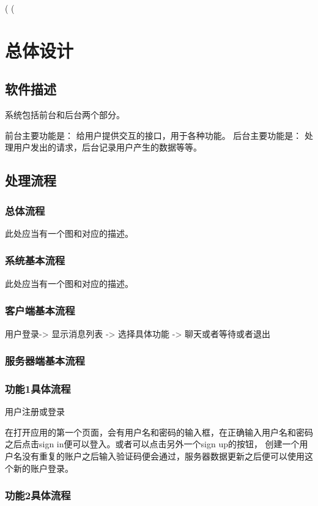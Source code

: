 \left( \left( \chapter{总体设计}
\section{软件描述}
系统包括前台和后台两个部分。

前台主要功能是：
给用户提供交互的接口，用于各种功能。
后台主要功能是：
处理用户发出的请求，后台记录用户产生的数据等等。

\section{处理流程}
\subsection{总体流程}
此处应当有一个图和对应的描述。

\subsection{系统基本流程}
此处应当有一个图和对应的描述。

\subsection{客户端基本流程}
用户登录-> 显示消息列表 -> 选择具体功能 -> 聊天或者等待或者退出

\subsection{服务器端基本流程}


\subsection{功能1具体流程}

用户注册或登录

在打开应用的第一个页面，会有用户名和密码的输入框，在正确输入用户名和密码之后点击sign in便可以登入。或者可以点击另外一个sign up的按钮，
创建一个用户名没有重复的账户之后输入验证码便会通过，服务器数据更新之后便可以使用这个新的账户登录。


\subsection{功能2具体流程}

